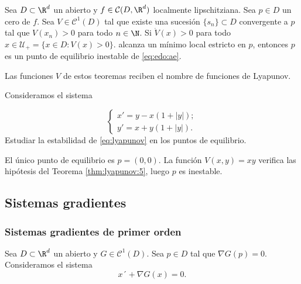 \begin{theorem} 
  \label{thm:chetaev}
  Sea $D \subset \R^d$ un abierto y $f \in \mathcal{C}(D, \R^d)$ localmente lipschitziana. Sea
  $p \in D$ un cero de $f$.  Sea $V \in \mathcal{C}^1(D)$ tal que existe una sucesión
  $\{s_n\} \subset D$ convergente a $p$ tal que $V(x_n) > 0$ para todo $n \in \N$. Si
  $\dot{V}(x) > 0$ para todo $x \in \mathcal{U}_+ = \{x \in D : V(x) > 0\}$.  alcanza un mínimo
  local estricto en $p$, entonces $p$ es un punto de equilibrio inestable de \eqref{eq:edo:ae}.
\end{theorem}

Las funciones $V$ de estos teoremas reciben el nombre de funciones de Lyapunov.

\begin{ex}
  Consideramos el sistema
  
  \begin{equation}
    \label{eq:lyapunov}
    \begin{cases}
      x' = y - x(1+|y|);\\
      y ' = x + y (1+|y|).
    \end{cases}
  \end{equation}
  Estudiar la estabilidad de \eqref{eq:lyapunov} en los puntos de equilibrio.

  El único punto de equilibrio es $p = (0,0)$. La función $V(x,y) = xy$ verifica las hipótesis del
  Teorema \ref{thm:lyapunov:5}, luego $p$ es inestable.
\end{ex}

\subsection{Sistemas gradientes}


\subsubsection{Sistemas gradientes de primer orden}

Sea $D \subset \R^d$ un abierto y $G \in \mathcal{C}^1(D)$. Sea $p \in D$ tal que $\nabla G(p) =
0$. Consideramos el sistema
\begin{equation}
  \label{eq:gradiente:1}
  x´ + \nabla G (x) = 0.
  \tag{G1}
\end{equation}

